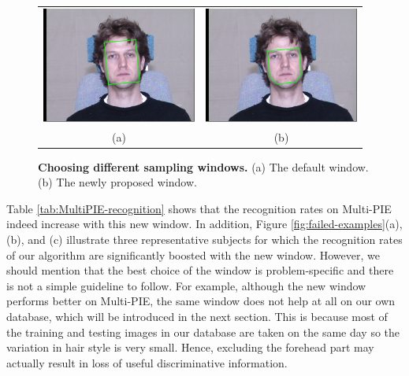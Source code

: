 \documentclass[12pt,journal,draftcls,letterpaper,onecolumn]{IEEEtran}
\begin{document}
\begin{figure}
\centering
{\small
\begin{tabular}{cc}
\includegraphics[height=1.5in]{figures_pami/example.png} &
\includegraphics[height=1.5in]{figures_pami/example_new.png} \vspace{-.1in} \\
(a) & (b) \vspace{-.1in}
\end{tabular}
}
\caption{{\bf Choosing different sampling windows.} (a) The default window. (b) The newly proposed window.}
\label{fig:new-mask}
\vspace{-.3in}
\end{figure}

Table \ref{tab:MultiPIE-recognition} shows that the
recognition rates on Multi-PIE indeed increase with this new
window. In addition, Figure \ref{fig:failed-examples}(a), (b),
and (c) illustrate three representative subjects for which the
recognition rates of our algorithm are significantly boosted
with the new window. However, we should mention that the best choice of the window
is problem-specific and there is
not a simple guideline to follow. For example, although the new
window performs better on Multi-PIE, the same window does not
help at all on our own database, which will be introduced in
the next section. This is because most of the training and
testing images in our database are taken on the same day so the
variation in hair style is very small. Hence, excluding the
forehead part may actually result in loss of useful
discriminative information.
\end{document}
